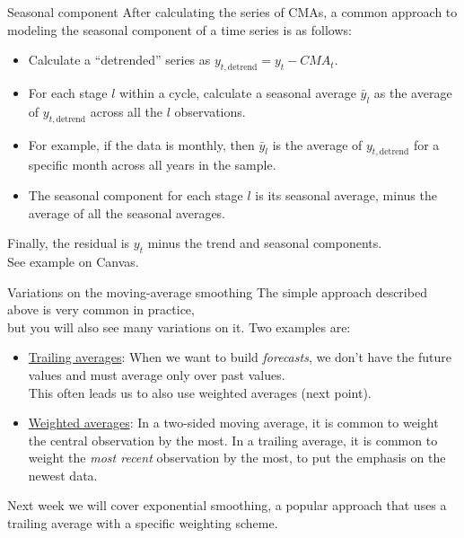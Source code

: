 \documentclass[t,12pt]{beamer}
\begin{document}
	\begin{frame}[c]{Seasonal component}
	After calculating the series of CMAs, a common approach to modeling the seasonal component of a time series is as follows:
	\begin{itemize}
	\medskip
	\item Calculate a ``detrended'' series as $y_{t,\text{detrend}} = y_t - CMA_t$.
	\smallskip
	\item For each stage $l$ within a cycle, calculate a seasonal average $\bar{y}_l$ as the average of $y_{t,\text{detrend}}$ across all the $l$ observations.
	\smallskip
	\item For example, if the data is monthly, then $\bar{y}_l$ is the average of $y_{t,\text{detrend}}$ for a specific month across all years in the sample.
	\smallskip
	\item The seasonal component for each stage $l$ is its seasonal average, minus the average of all the seasonal averages.
	\end{itemize}
	\medskip
	Finally, the residual is $y_t$ minus the trend and seasonal components.
	\\ \smallskip See example on Canvas.
	\end{frame}

	\begin{frame}[c]{Variations on the moving-average smoothing}
	The simple approach described above is very common in practice, 	
	\\ but you will also see many variations on it. Two examples are:
	\begin{itemize}
	\medskip
	\item \underline{Trailing averages}: When we want to build \emph{forecasts}, we don't have the future values and must average only over past values.
	\\ This often leads us to also use weighted averages (next point).
	\medskip
	\item \underline{Weighted averages}: In a two-sided moving average, it is common to weight the central observation by the most.
	In a trailing average, it is common to weight the \emph{most recent} observation by the most, to put the emphasis on the newest data.
	\end{itemize}
	\medskip
	Next week we will cover exponential smoothing, a popular approach that uses a trailing average with a specific weighting scheme.
	\end{frame}
\end{document}
